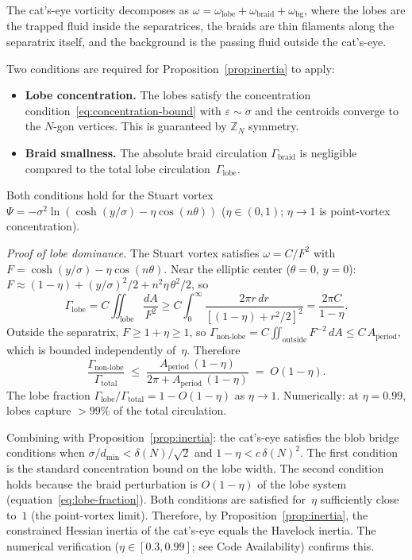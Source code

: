 \begin{remark}
\label{rem:catseye}
The cat's-eye vorticity decomposes as
$\omega = \omega_{\mathrm{lobe}} + \omega_{\mathrm{braid}} +
\omega_{\mathrm{bg}}$, where the lobes are the trapped fluid inside
the separatrices, the braids are thin filaments along the separatrix
itself, and the background is the passing fluid outside the cat's-eye.

Two conditions are required for Proposition~\ref{prop:inertia} to
apply:
\begin{itemize}
  \item[(i)] \textbf{Lobe concentration.}  The lobes satisfy the
    concentration condition~\eqref{eq:concentration-bound} with
    $\varepsilon \sim \sigma$ and the centroids converge to the
    $N$-gon vertices.  This is guaranteed by $\mathbb{Z}_N$ symmetry.
  \item[(ii)] \textbf{Braid smallness.}  The absolute braid circulation
    $\Gamma_{\mathrm{braid}}$ is negligible compared to the total
    lobe circulation~$\Gamma_{\mathrm{lobe}}$.
\end{itemize}

Both conditions hold for the Stuart vortex
$\Psi = -\sigma^2\ln(\cosh(y/\sigma) - \eta\cos(n\theta))$
($\eta \in (0,1)$; $\eta \to 1$ is point-vortex concentration).

\emph{Proof of lobe dominance.}  The Stuart vortex satisfies
$\omega = C/F^2$ with $F = \cosh(y/\sigma) - \eta\cos(n\theta)$.
Near the elliptic center ($\theta = 0$, $y = 0$):
$F \approx (1{-}\eta) + (y/\sigma)^2/2 + n^2\eta\,\theta^2/2$,
so
\[
  \Gamma_{\mathrm{lobe}} = C\iint_{\mathrm{lobe}} \frac{dA}{F^2}
  \ge C\int_0^\infty \frac{2\pi r\,dr}{[(1{-}\eta)+r^2/2]^2}
  = \frac{2\pi C}{1{-}\eta}.
\]
Outside the separatrix, $F \ge 1{+}\eta \ge 1$, so
$\Gamma_{\mathrm{non\text{-}lobe}} = C\!\iint_{\mathrm{outside}} F^{-2}\,dA
\le C\,A_{\mathrm{period}}$, which is bounded independently of~$\eta$.
Therefore
\begin{equation}\label{eq:lobe-fraction}
  \frac{\Gamma_{\mathrm{non\text{-}lobe}}}{\Gamma_{\mathrm{total}}}
  \;\le\; \frac{A_{\mathrm{period}}\,(1{-}\eta)}{2\pi + A_{\mathrm{period}}\,(1{-}\eta)}
  \;=\; O(1{-}\eta).
\end{equation}
The lobe fraction $\Gamma_{\mathrm{lobe}}/\Gamma_{\mathrm{total}}
= 1 - O(1{-}\eta)$ as $\eta \to 1$.  Numerically: at $\eta = 0.99$,
lobes capture $>99\%$ of the total circulation.

Combining with Proposition~\ref{prop:inertia}:
the cat's-eye satisfies the blob bridge conditions
when $\sigma/d_{\min} < \delta(N)/\!\sqrt{2}$
and $1 - \eta < c\,\delta(N)^2$.
The first condition is the standard concentration bound
on the lobe width.
The second condition holds because the braid perturbation
is $O(1{-}\eta)$ of the lobe system
(equation~\eqref{eq:lobe-fraction}).
Both conditions are satisfied for~$\eta$ sufficiently
close to~$1$ (the point-vortex limit).
Therefore, by Proposition~\ref{prop:inertia},
the constrained Hessian inertia of the cat's-eye
equals the Havelock inertia.
The numerical verification
($\eta \in [0.3, 0.99]$; see Code Availability) confirms this.


\end{remark}
